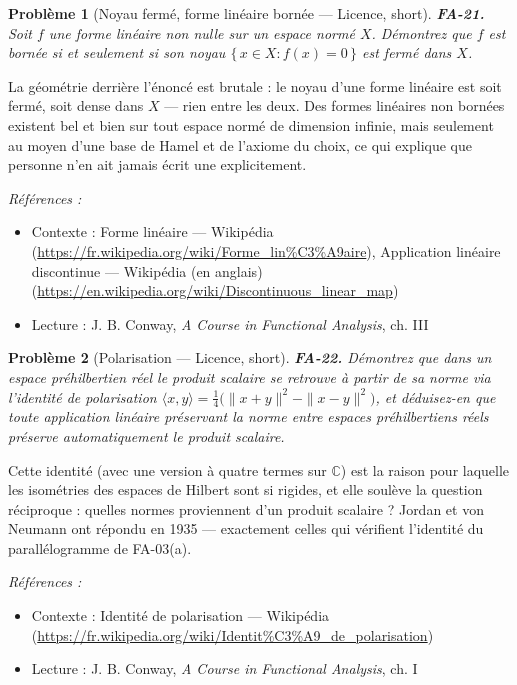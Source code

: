 \documentclass[11pt]{article}
\newtheorem{problem}{Problème}
\newenvironment{refs}{\par\small\noindent\emph{Références :}\begin{itemize}\setlength\itemsep{0pt}}{\end{itemize}\normalsize}
\begin{document}
\bigskip

\begin{problem}[{Noyau fermé, forme linéaire bornée --- Licence, short}]
\textbf{FA-21.} Soit $ f $ une forme linéaire non nulle sur un espace normé
$ X $. Démontrez que $ f $ est bornée si et seulement si son noyau
$ \{\, x \in X : f(x) = 0 \,\} $ est fermé dans $ X $.
\end{problem}

\noindent La géométrie derrière l'énoncé est brutale : le noyau d'une forme linéaire est soit
fermé, soit dense dans $ X $ --- rien entre les deux. Des formes linéaires non bornées existent bel et
bien sur tout espace normé de dimension infinie, mais seulement au moyen d'une base de Hamel et de
l'axiome du choix, ce qui explique que personne n'en ait jamais écrit une explicitement.

\begin{refs}
\item Contexte : Forme linéaire --- Wikipédia (\url{https://fr.wikipedia.org/wiki/Forme_lin%C3%A9aire}), Application linéaire discontinue --- Wikipédia (en anglais) (\url{https://en.wikipedia.org/wiki/Discontinuous_linear_map})
\item Lecture : J. B. Conway, \textit{A Course in Functional Analysis}, ch. III
\end{refs}

\bigskip

\begin{problem}[{Polarisation --- Licence, short}]
\textbf{FA-22.} Démontrez que dans un espace préhilbertien réel le produit
scalaire se retrouve à partir de sa norme via l'identité de polarisation
$ \langle x, y\rangle = \tfrac{1}{4}\big( \|x+y\|^2 - \|x-y\|^2 \big) $, et déduisez-en que toute
application linéaire préservant la norme entre espaces préhilbertiens réels préserve automatiquement
le produit scalaire.
\end{problem}

\noindent Cette identité (avec une version à quatre termes sur $\mathbb{C}$) est la raison pour laquelle
les isométries des espaces de Hilbert sont si rigides, et elle soulève la question réciproque : quelles
normes proviennent d'un produit scalaire ? Jordan et von Neumann ont répondu en 1935 --- exactement
celles qui vérifient l'identité du parallélogramme de FA-03(a).

\begin{refs}
\item Contexte : Identité de polarisation --- Wikipédia (\url{https://fr.wikipedia.org/wiki/Identit%C3%A9_de_polarisation})
\item Lecture : J. B. Conway, \textit{A Course in Functional Analysis}, ch. I
\end{refs}
\end{document}

